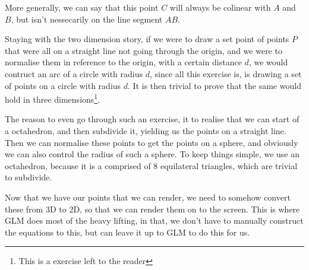 \documentclass[main.tex]{subfiles}
\begin{document}
More generally, we can say that this point $C$ will always be colinear with $A$ and $B$, but isn't nessecarily on the line segment $AB$.

Staying with the two dimension story, if we were to draw a set point of points $P$ that were all on a straight line not going through the origin,
and we were to normalise them in reference to the origin, with a certain distance $d$, we would contruct an arc of a circle with radius $d$, since all this 
exercise is, is drawing a set of points on a circle with radius $d$. It is then trivial to prove that the same would hold in three dimensions\footnote{This is a
exercise left to the reader}. 

The reason to even go through such an exercise, it to realise that we can start of a octahedron, and then subdivide it, yielding us the points on a straight line.
Then we can normalise these points to get the points on a sphere, and obviously we can also control the radius of such a sphere. To keep things simple, we use an
octahedron, because it is a comprised of 8 equilateral triangles, which are trivial to subdivide. %

Now that we have our points that we can render, we need to somehow convert these from 3D to 2D, so that we can render them on to the screen. This is where GLM does
most of the heavy lifting, in that, we don't have to manually construct the equations to this, but can leave it up to GLM to do this for us. 
\end{document}
